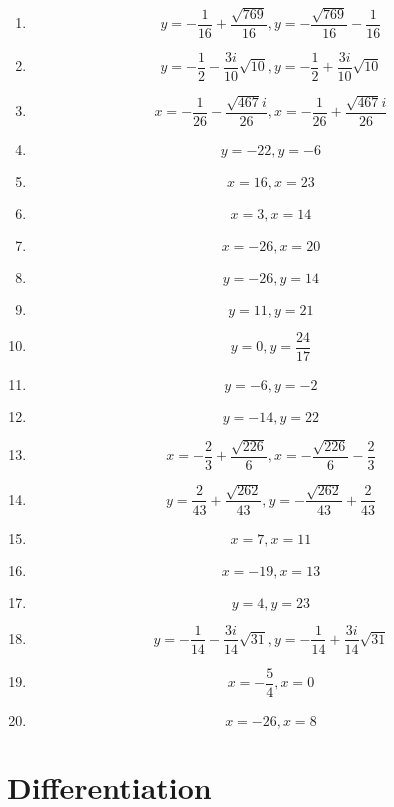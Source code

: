 \documentclass{article}
\begin{document}
        \begin{enumerate}
        \item$$y = - \frac{1}{16} + \frac{\sqrt{769}}{16}, y = - \frac{\sqrt{769}}{16} - \frac{1}{16}$$
\item$$y = - \frac{1}{2} - \frac{3 i}{10} \sqrt{10}, y = - \frac{1}{2} + \frac{3 i}{10} \sqrt{10}$$
\item$$x = - \frac{1}{26} - \frac{\sqrt{467} i}{26}, x = - \frac{1}{26} + \frac{\sqrt{467} i}{26}$$
\item$$y = -22, y = -6$$
\item$$x = 16, x = 23$$
\item$$x = 3, x = 14$$
\item$$x = -26, x = 20$$
\item$$y = -26, y = 14$$
\item$$y = 11, y = 21$$
\item$$y = 0, y = \frac{24}{17}$$
\item$$y = -6, y = -2$$
\item$$y = -14, y = 22$$
\item$$x = - \frac{2}{3} + \frac{\sqrt{226}}{6}, x = - \frac{\sqrt{226}}{6} - \frac{2}{3}$$
\item$$y = \frac{2}{43} + \frac{\sqrt{262}}{43}, y = - \frac{\sqrt{262}}{43} + \frac{2}{43}$$
\item$$x = 7, x = 11$$
\item$$x = -19, x = 13$$
\item$$y = 4, y = 23$$
\item$$y = - \frac{1}{14} - \frac{3 i}{14} \sqrt{31}, y = - \frac{1}{14} + \frac{3 i}{14} \sqrt{31}$$
\item$$x = - \frac{5}{4}, x = 0$$
\item$$x = -26, x = 8$$
        \end{enumerate}
        

        \section{Differentiation}
        
\end{document}
